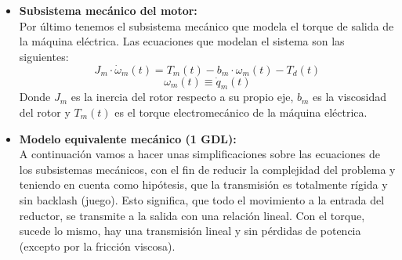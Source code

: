 \documentclass[10pt]{article}
\begin{document}
\begin{itemize}
	\item \textbf{Subsistema mecánico del motor:}\vspace{0.3cm}\\
	Por último tenemos el subsistema mecánico que modela el torque de salida de la máquina eléctrica. Las ecuaciones que modelan el sistema son las siguientes:
	\begin{equation}
		\label{eqn:sistMecanicoMotor}
		J_{m}\cdot \dot{\omega }_{m}\left ( t \right )=T_{m}\left ( t \right )-b_{m}\cdot \omega_{m}\left ( t \right )-T_{d}\left ( t \right )
	\end{equation}
	\begin{equation}
		\omega_{m}\left ( t \right )\equiv \dot{q}_{m}\left ( t \right )
	\end{equation}
	Donde $J_{m}$ es la inercia del rotor respecto a su propio eje, $b_{m}$ es la viscosidad del rotor y $T_{m}(t)$ es el torque electromecánico de la máquina eléctrica.

	\item \textbf{Modelo equivalente mecánico (1 GDL):}\vspace{0.3cm}\\
	A continuación vamos a hacer unas simplificaciones sobre las ecuaciones de los subsistemas mecánicos, con el fin de reducir la complejidad del problema y teniendo en cuenta como hipótesis, que la transmisión es totalmente rígida y sin backlash (juego).
    Esto significa, que todo el movimiento a la entrada del reductor, se transmite a la salida con una relación lineal. Con el torque, sucede lo mismo, hay una transmisión lineal y sin pérdidas de potencia (excepto por la fricción viscosa).


\end{itemize}
\end{document}
